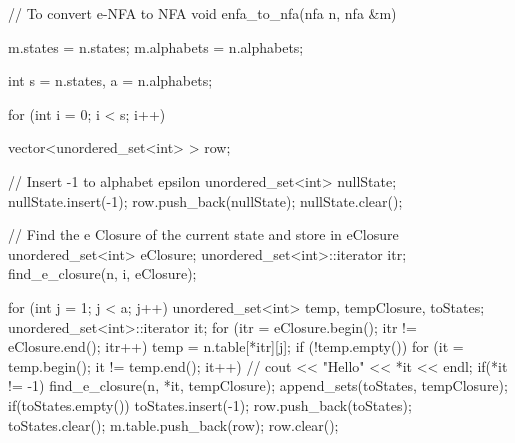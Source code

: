 // To convert e-NFA to NFA
void enfa_to_nfa(nfa n, nfa &m)
{
    m.states = n.states;
    m.alphabets = n.alphabets;

    int s = n.states, a = n.alphabets;

    for (int i = 0; i < s; i++)
    {
        vector<unordered_set<int> > row;

        // Insert -1 to alphabet epsilon
        unordered_set<int> nullState;
        nullState.insert(-1);
        row.push_back(nullState);
        nullState.clear();

        // Find the e Closure of the current state and store in eClosure
        unordered_set<int> eClosure;
        unordered_set<int>::iterator itr;
        find_e_closure(n, i, eClosure);

        for (int j = 1; j < a; j++)
        {
            unordered_set<int> temp, tempClosure, toStates;
            unordered_set<int>::iterator it;
            for (itr = eClosure.begin(); itr != eClosure.end(); itr++)
            {
                temp = n.table[*itr][j];
                if (!temp.empty())
                {
                    for (it = temp.begin(); it != temp.end(); it++)
                    {
                        // cout << "Hello" << *it << endl;
                        if(*it != -1) {
                            find_e_closure(n, *it, tempClosure);
                            append_sets(toStates, tempClosure);
                        }
                    }
                }
            }
            if(toStates.empty()) {
                toStates.insert(-1);
            }
            row.push_back(toStates);
            toStates.clear();
        }
        m.table.push_back(row);
        row.clear();
    }
}